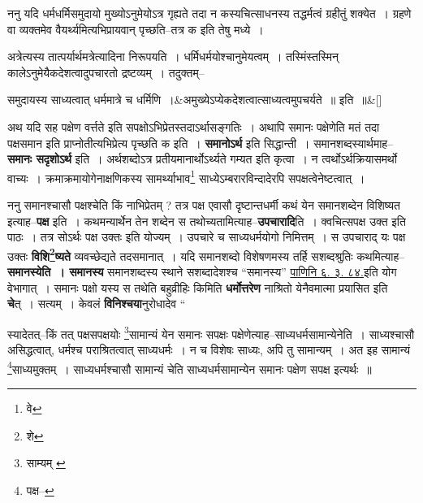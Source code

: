 \documentclass[article,12pt,a4paper]{memoir}
\begin{document}
	  \endgroup
	

	  \pstart ननु यदि धर्मधर्मिसमुदायो मुख्योऽनुमेयोऽत्र गृह्यते तदा न कस्यचित्साधनस्य तद्धर्मत्वं ग्रहीतुं शक्येत । ग्रहणे वा व्यक्तमेव वैयर्थ्यमित्यभिप्रायवान् पृच्छति--तत्र क इति तेषु मध्ये ।
	\pend
      

	  \pstart अत्रेत्यस्य तात्पर्यार्थमत्रेत्यादिना निरूपयति । धर्मिधर्मयोश्चानुमेयत्वम् । तस्मिंस्तस्मिन् कालेऽनुमेयैकदेशत्वादुपचारतो द्रष्टव्यम् । तदुक्तम्--
	\pend
      
	  \bigskip
	  \begingroup
	
	    
	    \stanza[\smallbreak]
	समुदायस्य साध्यत्वात् धर्ममात्रे च धर्मिणि ।&अमुख्येऽप्येकदेशत्वात्साध्यत्वमुपचर्यते ॥ इति ॥\&[\smallbreak]


	
	  \endgroup
	

	  \pstart अथ यदि सह पक्षेण वर्त्तते इति सपक्षोऽभिप्रेतस्तदाऽर्थासङ्गतिः । अथापि समानः पक्षेणेति मतं तदा पक्षसमान इति प्राप्नोतीत्यभिप्रेत्य पृच्छति क इति । \textbf{समानोऽर्थ} इति सिद्धान्ती । समानशब्दस्यार्थमाह--\textbf{समानः सदृशोऽर्थ} इति । अर्थशब्दोऽत्र प्रतीयमानार्थोऽर्थ्यते गम्यत इति कृत्वा । न त्वर्थोऽर्थक्रियासमर्थो वाच्यः । क्रमाक्रमायोगेनाक्षणिकस्य सामर्थ्याभाव\footnote{वे} साध्येऽम्बरारविन्दादेरपि सपक्षत्वेनेष्टत्वात् ।
	\pend
      

	  \pstart ननु समानश्चासौ पक्षश्चेति किं नाभिप्रेतम् ? तत्र पक्ष एवासौ दृष्टान्तधर्मी कथं येन समानशब्देन विशिष्यत इत्याह--\textbf{पक्ष} इति । कथमन्यार्थेन तेन शब्देन स तथोच्यतामित्याह--\textbf{उपचारादि}ति । क्वचित्सपक्ष उक्त इति पाठः । तत्र सोऽर्थः पक्ष उक्तः इति योज्यम् । उपचारे च साध्यधर्मयोगो निमित्तम् । स उपचाराद् यः पक्ष उक्तः \textbf{विशि\footnote{शे}\-ष्यते} व्यवच्छेद्यते तदसमानात् । यदि समानशब्दो विशेषणमस्य तर्हि सशब्दश्रुतिः कथमित्याह--\textbf{समानस्येति । समानस्य} समानशब्दस्य स्थाने सशब्दादेशश्च “समानस्य” \href{http://http://sarit.indology.info/?cref=Pā.6.3.84}{पाणिनि ६. ३. ८४.}इति योग वेभागात् । समानः पक्षो यस्य स तथेति बहुव्रीहिः किमिति \textbf{धर्मोत्तरेण} नाश्रितो येनैवमात्मा प्रयासित इति \textbf{चे}त् । सत्यम् । केवलं \textbf{विनिश्चया}नुरोधादेव  \leavevmode{} “
	  
	स्यादेतत्--किं तत् पक्षसपक्षयोः \footnote{साम्यम् \cite{dp-msB}}\-सामान्यं येन समानः सपक्षः पक्षेणेत्याह--साध्यधर्मसामान्येनेति । साध्यश्चासौ असिद्धत्वात्, धर्मश्च पराश्रितत्वात् साध्यधर्मः । न च विशेषः साध्यः, अपि तु सामान्यम् । अत इह सामान्यं \footnote{पक्ष--\cite{dp-msD-n}}\-साध्यमुक्तम् । साध्यधर्मश्चासौ सामान्यं चेति साध्यधर्मसामान्येन समानः पक्षेण सपक्ष इत्यर्थः ॥ 
	  
\end{document}
